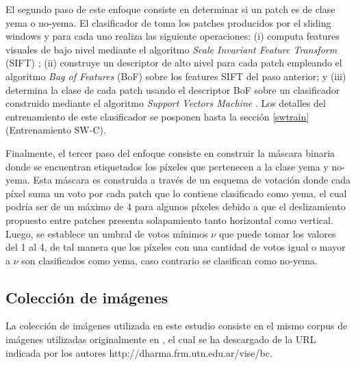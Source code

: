 \documentclass[a4paper,authoryear,review]{elsarticle}
\begin{document}
El segundo paso de este enfoque consiste en determinar si un patch es de clase yema o no-yema. El clasificador de \citet{perez2017image} toma los patches producidos por el sliding windows y para cada uno realiza las siguiente operaciones: (i) computa features visuales de bajo nivel mediante el algoritmo \emph{Scale Invariant Feature Transform} (SIFT) \cite{lowe2004distinctive}; (ii) construye un descriptor de alto nivel para cada patch empleando el algoritmo \emph{Bag of Features} (BoF) \cite{csurka2004visual} sobre los features SIFT del paso anterior; y (iii) determina la clase de cada patch usando el descriptor BoF sobre un clasificador construido mediante el algoritmo \emph{Support Vectors Machine} \cite{vapnik2013nature}. Los detalles del entrenamiento de este clasificador se posponen hasta la sección \ref{swtrain} (Entrenamiento SW-C).

Finalmente, el tercer paso del enfoque consiste en construir la máscara binaria donde se encuentran etiquetados los píxeles que pertenecen a la clase yema y no-yema. Esta máscara es construida a través de un esquema de votación donde cada píxel suma un voto por cada patch que lo contiene clasificado como yema, el cual podría ser de un máximo de 4 para algunos píxeles debido a que el deslizamiento propuesto entre patches presenta solapamiento tanto horizontal como vertical. Luego, se establece un umbral de votos mínimos $\nu$ que puede tomar los valores del 1 al 4, de tal manera que los píxeles con una cantidad de votos igual o mayor a $\nu$ son clasificados como yema, caso contrario se clasifican como no-yema.

\subsection{Colección de imágenes}

La colección de imágenes utilizada en este estudio consiste en el mismo corpus de imágenes utilizadas originalmente en \citet{perez2017image}, el cual se ha descargado de la URL indicada por los autores http://dharma.frm.utn.edu.ar/vise/bc. 
\end{document}
